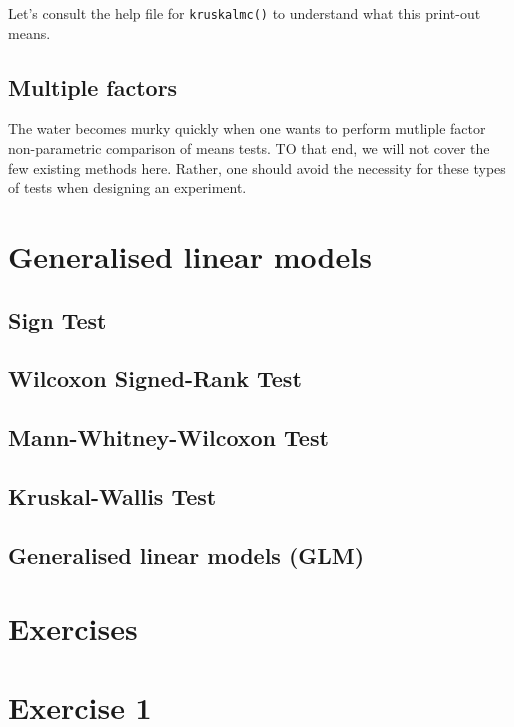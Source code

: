 \documentclass[english,10pt,a4paper,oneside]{book}
\theoremstyle{definition}
\theoremstyle{definition}
\theoremstyle{definition}
\theoremstyle{remark}
\begin{document}
Let's consult the help file for \texttt{kruskalmc()} to understand what
this print-out means.

\subsection{Multiple factors}\label{multiple-factors-2}

The water becomes murky quickly when one wants to perform mutliple
factor non-parametric comparison of means tests. TO that end, we will
not cover the few existing methods here. Rather, one should avoid the
necessity for these types of tests when designing an experiment.

\section{Generalised linear models}\label{generalised-linear-models}

\subsection{Sign Test}\label{sign-test}

\subsection{Wilcoxon Signed-Rank Test}\label{wilcoxon-signed-rank-test}

\subsection{Mann-Whitney-Wilcoxon
Test}\label{mann-whitney-wilcoxon-test}

\subsection{Kruskal-Wallis Test}\label{kruskal-wallis-test}

\subsection{Generalised linear models
(GLM)}\label{generalised-linear-models-glm}

\section{Exercises}\label{exercises-7}

\section{Exercise 1}\label{exercise-1-7}
\end{document}
